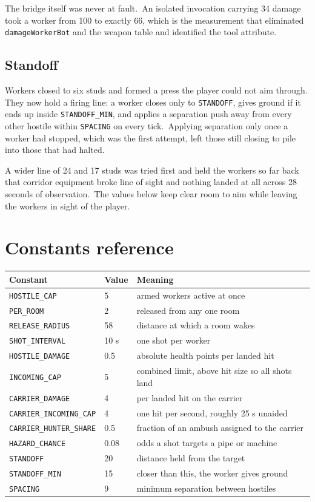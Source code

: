 The bridge itself was never at fault.\ An isolated invocation carrying 34 damage
took a worker from 100 to exactly 66, which is the measurement that eliminated
\texttt{damageWorkerBot} and the weapon table and identified the tool attribute.\

\subsection{Standoff}
Workers closed to six studs and formed a press the player could not aim through.
They now hold a firing line: a worker closes only to \texttt{STANDOFF}, gives
ground if it ends up inside \texttt{STANDOFF\_MIN}, and applies a separation
push away from every other hostile within \texttt{SPACING} on every tick.\
Applying separation only once a worker had stopped, which was the first attempt,
left those still closing to pile into those that had halted.\

A wider line of 24 and 17 studs was tried first and held the workers so far back
that corridor equipment broke line of sight and nothing landed at all across 28
seconds of observation.\ The values below keep clear room to aim while leaving
the workers in sight of the player.\

\section{Constants reference}
\begin{center}
\begin{tabular}{@{}lll@{}}
\toprule
\textbf{Constant} & \textbf{Value} & \textbf{Meaning} \\
\midrule
\texttt{HOSTILE\_CAP} & 5 & armed workers active at once \\
\texttt{PER\_ROOM} & 2 & released from any one room \\
\texttt{RELEASE\_RADIUS} & 58 & distance at which a room wakes \\
\texttt{SHOT\_INTERVAL} & 10 s & one shot per worker \\
\texttt{HOSTILE\_DAMAGE} & 0.5 & absolute health points per landed hit \\
\texttt{INCOMING\_CAP} & 5 & combined limit, above hit size so all shots land \\
\texttt{CARRIER\_DAMAGE} & 4 & per landed hit on the carrier \\
\texttt{CARRIER\_INCOMING\_CAP} & 4 & one hit per second, roughly 25 s unaided \\
\texttt{CARRIER\_HUNTER\_SHARE} & 0.5 & fraction of an ambush assigned to the carrier \\
\texttt{HAZARD\_CHANCE} & 0.08 & odds a shot targets a pipe or machine \\
\texttt{STANDOFF} & 20 & distance held from the target \\
\texttt{STANDOFF\_MIN} & 15 & closer than this, the worker gives ground \\
\texttt{SPACING} & 9 & minimum separation between hostiles \\
\bottomrule
\end{tabular}
\end{center}

